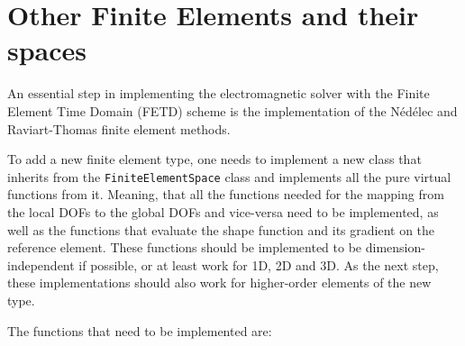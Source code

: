 \section{Other Finite Elements and their spaces}

An essential step in implementing the electromagnetic solver with the Finite Element Time Domain (FETD)
scheme is the implementation of the Nédélec and Raviart-Thomas finite element methods.

To add a new finite element type, one needs to implement a new class that inherits from the \texttt{FiniteElementSpace} class
and implements all the pure virtual functions from it.
Meaning, that all the functions needed for the mapping from the local DOFs to the global DOFs and vice-versa need to be implemented,
as well as the functions that evaluate the shape function and its gradient on the reference element.
These functions should be implemented to be dimension-independent if possible, or at least work for 1D, 2D and 3D.
As the next step, these implementations should also work for higher-order elements of the new type.

The functions that need to be implemented are:

